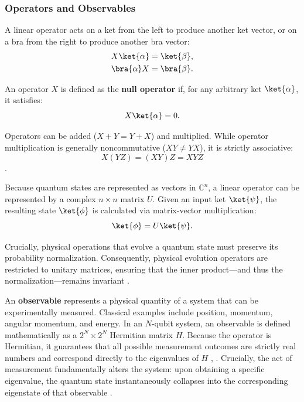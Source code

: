 \subsubsection{Operators and Observables}
A linear operator acts on a ket from the left to produce another ket vector, or on a bra from the right to produce another bra vector:
\begin{align}
    X\ket{\alpha} &= \ket{\beta}, \\
    \bra{\alpha}X &= \bra{\beta}.
\end{align}

An operator $X$ is defined as the \textbf{null operator} if, for any arbitrary ket $\ket{\alpha}$, it satisfies:
\begin{equation}
    X \ket{\alpha} = 0.
\end{equation}

Operators can be added ($X + Y = Y + X$) and multiplied. While operator multiplication is generally noncommutative ($XY \neq YX$), it is strictly associative:
\begin{equation}
    X(YZ) = (XY)Z = XYZ
\end{equation}
\cite[p.11, 13-15]{sakurai2020modern}.

Because quantum states are represented as vectors in $\mathbb{C}^n$, a linear operator can be represented by a complex $n \times n$ matrix $U$. Given an input ket $\ket{\psi}$, the resulting state $\ket{\phi}$ is calculated via matrix-vector multiplication:
\begin{equation}
    \ket{\phi} = U\ket{\psi}.
\end{equation}

Crucially, physical operations that evolve a quantum state must preserve its probability normalization. Consequently, physical evolution operators are restricted to unitary matrices, ensuring that the inner product—and thus the normalization—remains invariant
\cite[p.19]{Kottmann2025}.

An \textbf{observable} represents a physical quantity of a system that can be experimentally measured. Classical examples include position, momentum, angular momentum, and energy. In an $N$-qubit system, an observable is defined mathematically as a $2^N \times 2^N$ Hermitian matrix $H$. Because the operator is Hermitian, it guarantees that all possible measurement outcomes are strictly real numbers and correspond directly to the eigenvalues of $H$ \cite[p.16f.]{sakurai2020modern}, \cite[p.8]{schleich2025quantum}. Crucially, the act of measurement fundamentally alters the system: upon obtaining a specific eigenvalue, the quantum state instantaneously collapses into the corresponding eigenstate of that observable \cite[p.22]{sakurai2020modern}.

